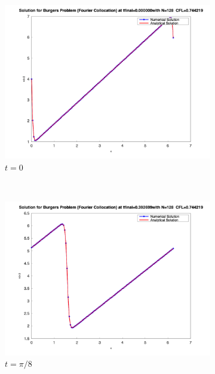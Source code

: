 \begin{figure}[H]
	\centering
	\begin{subfigure}{0.5\textwidth}
		\includegraphics[width=\textwidth]{media/burger_tfinal_fc_128_0.000000.png}
		\caption{$t=0$}
		\label{sfig:sublabel1}
	\end{subfigure}%
	~
	\begin{subfigure}{0.5\textwidth}
		\includegraphics[width=\textwidth]{media/burger_tfinal_fc_128_0.392699.png}
		\caption{$t = \pi/ 8$}
		\label{sfig:sublabel2}
	\end{subfigure}\\
	\begin{subfigure}{0.5\textwidth}

\end{subfigure}
\end{figure}

